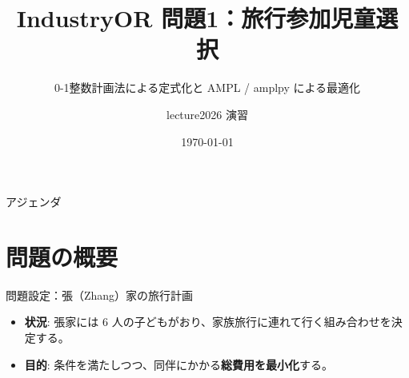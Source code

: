 \documentclass[aspectratio=169,11pt]{beamer}
\title{\textbf{IndustryOR 問題1：旅行参加児童選択}}
\subtitle{0-1整数計画法による定式化と AMPL / amplpy による最適化}
\author{lecture2026 演習}
\date{\today}
\institute{数理最適化モデリング}
\begin{document}
\maketitle

\begin{frame}{アジェンダ}
  \tableofcontents
\end{frame}

\section{問題の概要}

\begin{frame}{問題設定：張（Zhang）家の旅行計画}
  \begin{itemize}\small
    \item \textbf{状況}: 張家には 6 人の子どもがおり、家族旅行に連れて行く組み合わせを決定する。
    \item \textbf{目的}: 条件を満たしつつ、同伴にかかる\alert{\textbf{総費用を最小化}}する。
  \end{itemize}
  \vspace{-0.2cm}


\end{frame}
\end{document}
